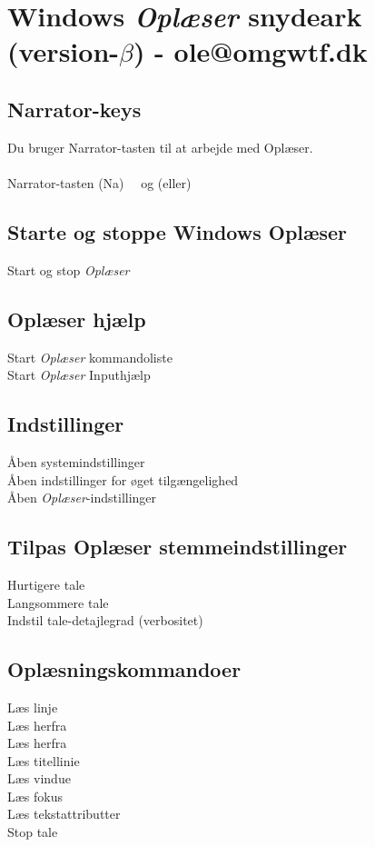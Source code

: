 \documentclass[a4paper, landscape, 11pt]{scrartcl}
\newcommand{\command}[2]{#1~\dotfill{}~#2\\} %
\begin{document}
\section*{Windows \emph{Oplæser} snydeark (version-$\beta$) - ole@omgwtf.dk}

\hrulefill{}

\begin{multicols}{2}

\subsection*{Narrator-keys}
Du bruger Narrator-tasten til at arbejde med Oplæser. 
\\ \\
\command{Narrator-tasten (Na)}{ og (eller) \keys{Insert}}

\subsection*{Starte og stoppe Windows Oplæser}
\command{Start og stop \emph{Oplæser}}{\keys{\faWindows + \ctrl + \enter}}

\subsection*{Oplæser hjælp}
\command{Start \emph{Oplæser} kommandoliste}{}
\command{Start \emph{Oplæser} Inputhjælp}{}

\subsection*{Indstillinger}
\command{Åben systemindstillinger}{}
\command{Åben indstillinger for øget tilgængelighed}{\keys{\faWindows + u}}
\command{Åben \emph{Oplæser}-indstillinger}{\keys{\faWindows + \ctrl + n}}


\subsection*{Tilpas Oplæser stemmeindstillinger}
\command{Hurtigere tale}{}
\command{Langsommere tale}{}
\command{Indstil tale-detajlegrad (verbositet)}{}

\subsection*{Oplæsningskommandoer}
\command{Læs linje}{}
\command{Læs herfra}{}
\command{Læs herfra}{}
\command{Læs titellinie}{}
\command{Læs vindue}{}
\command{Læs fokus}{}
\command{Læs tekstattributter}{}
\command{Stop tale}{\keys{\ctrl}}


\end{multicols}
\end{document}
